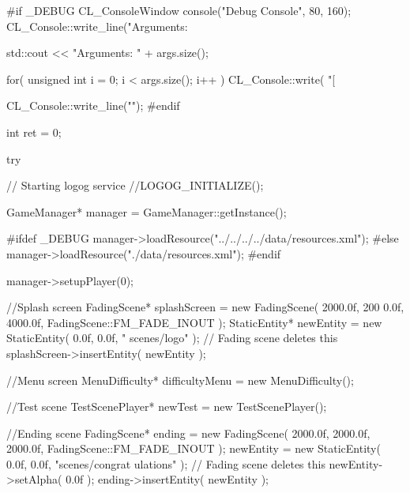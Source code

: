 \begin{DoxyCode}
                                                         {

#if _DEBUG
                CL_ConsoleWindow console("Debug Console", 80, 160);
                CL_Console::write_line("Arguments: %

                std::cout << "Arguments: " + args.size();

                for( unsigned int i = 0; i < args.size(); i++ )
                {
                        CL_Console::write( "[%
                }

                CL_Console::write_line("");
#endif

                int ret = 0;


                try
                {
                        // Starting logog service
                        //LOGOG_INITIALIZE();
        
                        GameManager* manager = GameManager::getInstance();

#ifdef _DEBUG
                        manager->loadResource("../../../../data/resources.xml");
#else
                        manager->loadResource("./data/resources.xml");
#endif

                        manager->setupPlayer(0);
        
                        //Splash screen
                        FadingScene* splashScreen = new FadingScene( 2000.0f, 200
      0.0f, 4000.0f, FadingScene::FM_FADE_INOUT );
                        StaticEntity* newEntity = new StaticEntity( 0.0f, 0.0f, "
      scenes/logo" ); // Fading scene deletes this
                        splashScreen->insertEntity( newEntity );
        
                        //Menu screen
                        MenuDifficulty* difficultyMenu = new MenuDifficulty();
        
                        //Test scene
                        TestScenePlayer* newTest = new TestScenePlayer();

                        //Ending scene
                        FadingScene* ending = new FadingScene( 2000.0f, 2000.0f, 
      2000.0f, FadingScene::FM_FADE_INOUT );
                        newEntity = new StaticEntity( 0.0f, 0.0f, "scenes/congrat
      ulations" ); // Fading scene deletes this
                        newEntity->setAlpha( 0.0f );
                        ending->insertEntity( newEntity );
                        
}}
\end{DoxyCode}
